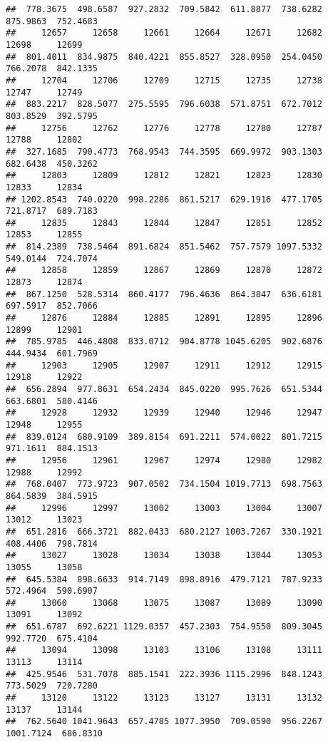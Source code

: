 \documentclass[
]{article}
\begin{document}
\begin{verbatim}
##  778.3675  498.6587  927.2832  709.5842  611.8877  738.6282  875.9863  752.4683 
##     12657     12658     12661     12664     12671     12682     12698     12699 
##  801.4011  834.9875  840.4221  855.8527  328.0950  254.0450  766.2078  842.1335 
##     12704     12706     12709     12715     12735     12738     12747     12749 
##  883.2217  828.5077  275.5595  796.6038  571.8751  672.7012  803.8529  392.5795 
##     12756     12762     12776     12778     12780     12787     12788     12802 
##  327.1685  790.4773  768.9543  744.3595  669.9972  903.1303  682.6438  450.3262 
##     12803     12809     12812     12821     12823     12830     12833     12834 
## 1202.8543  740.0220  998.2286  861.5217  629.1916  477.1705  721.8717  689.7183 
##     12835     12843     12844     12847     12851     12852     12853     12855 
##  814.2389  738.5464  891.6824  851.5462  757.7579 1097.5332  549.0144  724.7074 
##     12858     12859     12867     12869     12870     12872     12873     12874 
##  867.1250  528.5314  860.4177  796.4636  864.3847  636.6181  697.5917  852.7066 
##     12876     12884     12885     12891     12895     12896     12899     12901 
##  785.9785  446.4808  833.0712  904.8778 1045.6205  902.6876  444.9434  601.7969 
##     12903     12905     12907     12911     12912     12915     12918     12922 
##  656.2894  977.8631  654.2434  845.0220  995.7626  651.5344  663.6801  580.4146 
##     12928     12932     12939     12940     12946     12947     12948     12955 
##  839.0124  680.9109  389.8154  691.2211  574.0022  801.7215  971.1611  884.1513 
##     12956     12961     12967     12974     12980     12982     12988     12992 
##  768.0407  773.9723  907.0502  734.1504 1019.7713  698.7563  864.5839  384.5915 
##     12996     12997     13002     13003     13004     13007     13012     13023 
##  651.2816  666.3721  882.0433  680.2127 1003.7267  330.1921  408.4406  798.7814 
##     13027     13028     13034     13038     13044     13053     13055     13058 
##  645.5384  898.6633  914.7149  898.8916  479.7121  787.9233  572.4964  590.6907 
##     13060     13068     13075     13087     13089     13090     13091     13092 
##  651.6787  692.6221 1129.0357  457.2303  754.9550  809.3045  992.7720  675.4104 
##     13094     13098     13103     13106     13108     13111     13113     13114 
##  425.9546  531.7078  885.1541  222.3936 1115.2996  848.1243  773.5029  720.7280 
##     13120     13122     13123     13127     13131     13132     13137     13144 
##  762.5640 1041.9643  657.4785 1077.3950  709.0590  956.2267 1001.7124  686.8310 

\end{verbatim}
\end{document}

